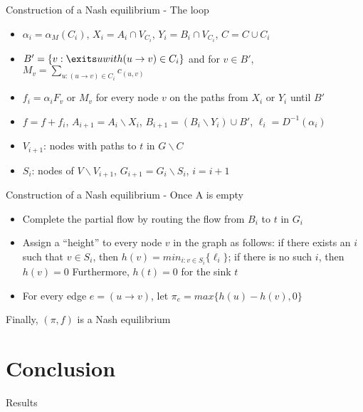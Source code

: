 \documentclass{beamer}
\begin{document}
\begin{frame}{Construction of a Nash equilibrium - The loop}

\begin{itemize}

\item $\alpha_i = \alpha_M(C_i)$, $X_i = A_i \cap V_{C_i}$, $Y_i = B_i \cap V_{C_i}$, $C = C \cup C_i$
\item $B' = \{ v : \exits u with (u \to v) \in C_i\}$ and for $v \in B'$, $M_v = \sum_{u :(u \to v) \in C_i}c_{(u,v)}$
\item $f_i = \alpha_i F_v$ or $M_v$ for every node $v$ on the paths from $X_i$ or $Y_i$ until $B'$
\item $f = f+f_i$, $A_{i+1} = A_i \backslash X_i$, $B_{i+1} = (B_i \backslash Y_i) \cup B'$, $\ell_i = D^{-1}(\alpha_i)$
\item $V_{i+1}$: nodes with paths to $t$ in $G \backslash C$
\item $S_i$: nodes of $V \backslash V_{i+1}$, $G_{i+1} = G_i \backslash S_i$, $i=i+1$

\end{itemize}

\end{frame}

\begin{frame}{Construction of a Nash equilibrium - Once A is empty}

\begin{itemize}

\item Complete the partial flow by routing the flow from $B_i$ to $t$ in $G_i$
\item Assign a “height” to every node $v$ in the graph as follows: if there exists an $i$ such 
that $v \in S_i$, then $h(v) = min_{i:v\in S_i}\{\ell_i\}$; if there is no such $i$,
 then $h(v) = 0$ Furthermore, $h(t)= 0$ for the sink $t$
\item For every edge $e = (u \to v)$, let $\pi_e = max\{h(u) - h(v), 0\}$

\end{itemize}

Finally, $(\pi, f)$ is a Nash equilibrium 

\end{frame}

\section{Conclusion}

\begin{frame}{Results}
\end{frame}
\end{document}
